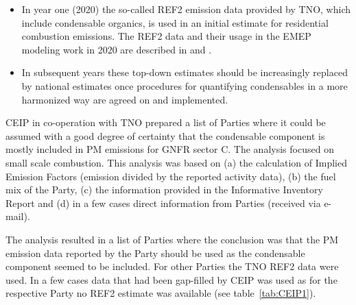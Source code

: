 \begin{itemize}
\item In year one (2020) the so-called REF2 emission data provided by TNO, which include condensable organics,  is used in an initial estimate for residential combustion emissions. The REF2 data and their usage in the EMEP modeling work in 2020 are described  in  \citet{R2020:SVOC} and \citet{R2020:CAMSREF2}. 
\item  In subsequent years these top-down estimates should be increasingly replaced by national estimates once procedures for quantifying condensables in a more harmonized way are agreed on and implemented.
\end{itemize}

CEIP in co-operation with TNO prepared a list of Parties where it could be assumed with a good degree of certainty that the condensable component is mostly included in PM emissions for GNFR sector C. The analysis focused on small scale combustion. This analysis was based on (a) the calculation of Implied Emission Factors (emission divided by the reported activity data), (b) the fuel mix of the Party, (c) the information provided in the Informative Inventory Report and (d) in a few cases direct information from Parties (received via e-mail).

The analysis resulted in a list of Parties where the conclusion was that the PM emission data reported by the Party should be used as the condensable component seemed to be included. For other Parties the TNO REF2 data were used. In a few cases data that had been gap-filled by CEIP was used as for the respective Party no REF2 estimate was available (see table~\ref{tab:CEIP1}).



